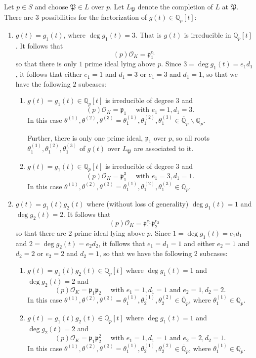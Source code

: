 Let $p \in S$ and choose $\mathfrak{P} \in L$ over $p$. Let $L_{\mathfrak{P}}$ denote the completion of $L$ at $\mathfrak{P}$. There are $3$ possibilities for the factorization of ${g(t) \in \mathbb{Q}_p[t]}$:
\begin{enumerate}
\item $g(t) = g_1(t)$, where $\deg{g_1(t)} = 3$. That is $g(t)$ is irreducible in $\mathbb{Q}_p[t]$. It follows that 
\[(p)\mathcal{O}_K = \mathfrak{p}_1^{e_1}\]
so that there is only $1$ prime ideal lying above $p$. Since $3 = \deg{g_1(t)} = e_1d_1$, it follows that either $e_1 = 1$ and $d_1 = 3$ or $e_1 = 3$ and $d_1 = 1$, so that we have the following $2$ subcases:

\begin{enumerate}
\item $g(t) = g_1(t) \in \mathbb{Q}_p[t]$ is irreducible of degree $3$ and
\[(p)\mathcal{O}_K = \mathfrak{p}_1 \quad \text{ with } e_1 = 1, d_1 = 3.\]
In this case $\theta^{(1)}, \theta^{(2)}, \theta^{(3)} = \theta_1^{(1)}, \theta_1^{(2)}, \theta_1^{(3)} \in \overline{\mathbb{Q}}_p\backslash \mathbb{Q}_p$. 

Further, there is only one prime ideal, $\mathfrak{p_1}$ over $p$, so all roots $\theta_1^{(1)}, \theta_1^{(2)}, \theta_1^{(3)}$ of $g(t)$ over $L_{\mathfrak{P}}$ are associated to it. 

\item $g(t) = g_1(t) \in \mathbb{Q}_p[t]$ is irreducible of degree $3$ and
\[(p)\mathcal{O}_K = \mathfrak{p}_1^3 \quad \text{ with } e_1 = 3, d_1 = 1.\]
In this case $\theta^{(1)}, \theta^{(2)}, \theta^{(3)} = \theta_1^{(1)}, \theta_1^{(2)}, \theta_1^{(3)} \in \overline{\mathbb{Q}}_p$.
\end{enumerate}

\item $g(t) = g_1(t)g_2(t)$ where (without loss of generality) $\deg{g_1(t)} = 1$ and $\deg{g_2(t)} = 2$. It follows that 
\[(p)\mathcal{O}_K = \mathfrak{p}_1^{e_1}\mathfrak{p}_2^{e_2}\]
so that there are $2$ prime ideal lying above $p$. Since $1 = \deg{g_1(t)} = e_1d_1$ and $2 = \deg{g_2(t)} = e_2d_2$, it follows that $e_1 = d_1 = 1$ and either $e_2 = 1$ and $d_2 = 2$ or $e_2 = 2$ and $d_2 = 1$, so that we have the following 2 subcases:

\begin{enumerate}
\item $g(t) = g_1(t)g_2(t) \in \mathbb{Q}_p[t]$ where $\deg{g_1(t)} = 1$ and $\deg{g_2(t)} = 2$ and 
\[(p)\mathcal{O}_K = \mathfrak{p}_1 \mathfrak{p}_2 \quad \text{ with } 
	e_1 = 1, d_1 = 1 \text{ and } e_2 = 1, d_2 = 2.\]
In this case $\theta^{(1)}, \theta^{(2)}, \theta^{(3)} = \theta_1^{(1)}, \theta_2^{(1)}, \theta_2^{(2)} \in \overline{\mathbb{Q}}_p$, where $\theta_1^{(1)} \in \mathbb{Q}_p$.
\item $g(t) = g_1(t)g_2(t) \in \mathbb{Q}_p[t]$ where $\deg{g_1(t)} = 1$ and $\deg{g_2(t)} = 2$ and
\[(p)\mathcal{O}_K = \mathfrak{p}_1 \mathfrak{p}_2^2 \quad \text{ with } 
	e_1 = 1, d_1 = 1 \text{ and } e_2 = 2, d_2 = 1.\]
In this case $\theta^{(1)}, \theta^{(2)}, \theta^{(3)} = \theta_1^{(1)}, \theta_2^{(1)}, \theta_2^{(2)} \in \overline{\mathbb{Q}}_p$, where $\theta_1^{(1)} \in \mathbb{Q}_p$.
\end{enumerate}


\end{enumerate}
